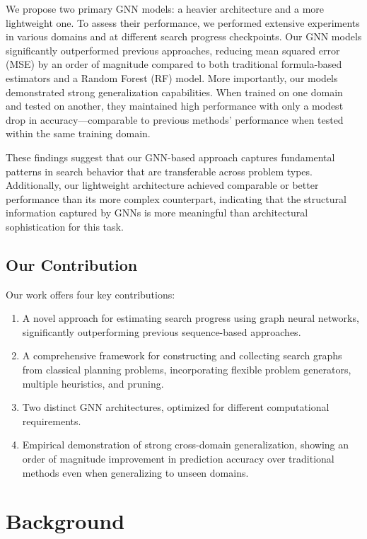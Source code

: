 \documentclass[letterpaper]{article}
\begin{document}
We propose two primary GNN models: a heavier architecture and a more lightweight one. To assess their performance, we performed extensive experiments in various domains and at different search progress checkpoints. Our GNN models significantly outperformed previous approaches, reducing mean squared error (MSE) by an order of magnitude compared to both traditional formula-based estimators and a Random Forest (RF) model. More importantly, our models demonstrated strong generalization capabilities. When trained on one domain and tested on another, they maintained high performance with only a modest drop in accuracy—comparable to previous methods' performance when tested within the same training domain.

These findings suggest that our GNN-based approach captures fundamental patterns in search behavior that are transferable across problem types. Additionally, our lightweight architecture achieved comparable or better performance than its more complex counterpart, indicating that the structural information captured by GNNs is more meaningful than architectural sophistication for this task.

\subsection{Our Contribution}

Our work offers four key contributions:
\begin{enumerate}
    \item A novel approach for estimating search progress using graph neural networks, significantly outperforming previous sequence-based approaches.
    \item A comprehensive framework for constructing and collecting search graphs from classical planning problems, incorporating flexible problem generators, multiple heuristics, and pruning.
    \item Two distinct GNN architectures, optimized for different computational requirements.
    \item Empirical demonstration of strong cross-domain generalization, showing an order of magnitude improvement in prediction accuracy over traditional methods even when generalizing to unseen domains.
\end{enumerate}

\section{Background}
\end{document}
